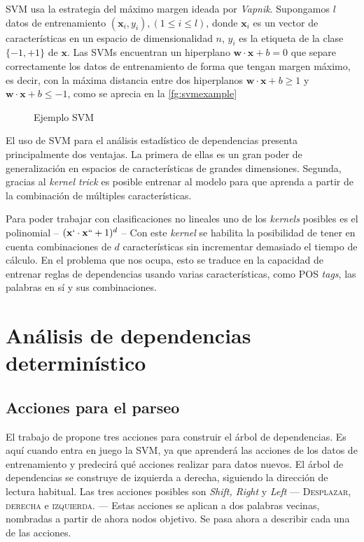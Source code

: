\ac{SVM} usa la estrategia del máximo margen ideada por
\emph{Vapnik}. Supongamos $l$ datos de entrenamiento
$(\mathbf{x}_i,y_i), (1 \leq i \leq l)$, donde $\mathbf{x}_i$ es un vector de
características en un espacio de dimensionalidad $n$, $y_i$ es la etiqueta de la
clase $\{-1, +1\}$ de $\mathbf{x}$. Las \acp{SVM} encuentran un hiperplano
$\mathbf{w}\cdot \mathbf{x} + b = 0$ que separe correctamente los datos de
entrenamiento de forma que tengan margen máximo, es decir, con la máxima
distancia entre dos hiperplanos $\mathbf{w}\cdot \mathbf{x} + b \geq 1$ y
$\mathbf{w}\cdot \mathbf{x} + b \leq -1$, como se aprecia en la
\autoref{fg:svmexample}
\begin{figure}[ht]
  \centering
  \caption{Ejemplo \ac{SVM}}
  \label{fg:svmexample}
\end{figure}
El uso de \ac{SVM} para el análisis estadístico de dependencias presenta
principalmente dos ventajas. La primera de ellas es un gran poder de
generalización en espacios de características de grandes dimensiones. Segunda,
gracias al \emph{kernel trick} es posible entrenar al modelo para que aprenda a
partir de la combinación de múltiples características.

Para poder trabajar con clasificaciones no lineales uno de los \emph{kernels}
posibles es el polinomial -- $(\mathbf{x}` \cdot \mathbf{x}`` + 1)^d$ -- Con
este \emph{kernel} se habilita la posibilidad de tener en cuenta combinaciones
de $d$ características sin incrementar demasiado el tiempo de cálculo. En el
problema que nos ocupa, esto se traduce en la capacidad de entrenar reglas de
dependencias usando varias características, como \ac{POS} \emph{tags}, las
palabras en sí y sus combinaciones.

\section{Análisis de dependencias determinístico}
\label{sec:depanalysis}

\subsection{Acciones para el parseo}
\label{subsec:parseractions}

El trabajo de \citeauthor{yamada2003} propone tres acciones para construir el
árbol de dependencias. Es aquí cuando entra en juego la \ac{SVM}, ya que
aprenderá las acciones de los datos de entrenamiento y predecirá qué acciones
realizar para datos nuevos. El árbol de dependencias se construye de izquierda a
derecha, siguiendo la dirección de lectura habitual. Las tres acciones
posibles son \emph{Shift, Right} y \emph{Left} --- \textsc{Desplazar, derecha} e
\textsc{izquierda}. --- Estas acciones se aplican a dos palabras vecinas, nombradas a
partir de ahora nodos objetivo. Se pasa ahora a describir cada una de las
acciones.

